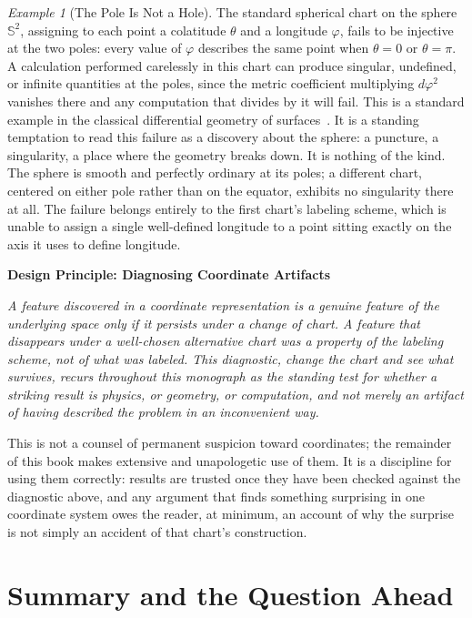 \documentclass[11pt,fleqn]{book}
\numberwithin{equation}{chapter}
\newenvironment{principle}[1]
  {\begin{principleEnv}
   \noindent\textbf{Design Principle: #1}\par\smallskip\itshape}
  {\end{principleEnv}}
\theoremstyle{plain}
\theoremstyle{definition}
\theoremstyle{remark}
\newtheorem{example}[theorem]{Example}
\newcommand{\Sphere}{\mathbb{S}^{2}}
\begin{document}
\begin{example}[The Pole Is Not a Hole]
The standard spherical chart on the sphere \(\Sphere\), assigning to each point a colatitude \(\theta\) and a longitude \(\varphi\), fails to be injective at the two poles: every value of \(\varphi\) describes the same point when \(\theta=0\) or \(\theta=\pi\). A calculation performed carelessly in this chart can produce singular, undefined, or infinite quantities at the poles, since the metric coefficient multiplying \(d\varphi^2\) vanishes there and any computation that divides by it will fail. This is a standard example in the classical differential geometry of surfaces~\cite{docarmo1976}. It is a standing temptation to read this failure as a discovery about the sphere: a puncture, a singularity, a place where the geometry breaks down. It is nothing of the kind. The sphere is smooth and perfectly ordinary at its poles; a different chart, centered on either pole rather than on the equator, exhibits no singularity there at all. The failure belongs entirely to the first chart's labeling scheme, which is unable to assign a single well-defined longitude to a point sitting exactly on the axis it uses to define longitude.
\end{example}

\begin{principle}{Diagnosing Coordinate Artifacts}
A feature discovered in a coordinate representation is a genuine feature of the underlying space only if it persists under a change of chart. A feature that disappears under a well-chosen alternative chart was a property of the labeling scheme, not of what was labeled. This diagnostic, change the chart and see what survives, recurs throughout this monograph as the standing test for whether a striking result is physics, or geometry, or computation, and not merely an artifact of having described the problem in an inconvenient way.
\end{principle}

This is not a counsel of permanent suspicion toward coordinates; the remainder of this book makes extensive and unapologetic use of them. It is a discipline for using them correctly: results are trusted once they have been checked against the diagnostic above, and any argument that finds something surprising in one coordinate system owes the reader, at minimum, an account of why the surprise is not simply an accident of that chart's construction.

\section{Summary and the Question Ahead}
\end{document}
